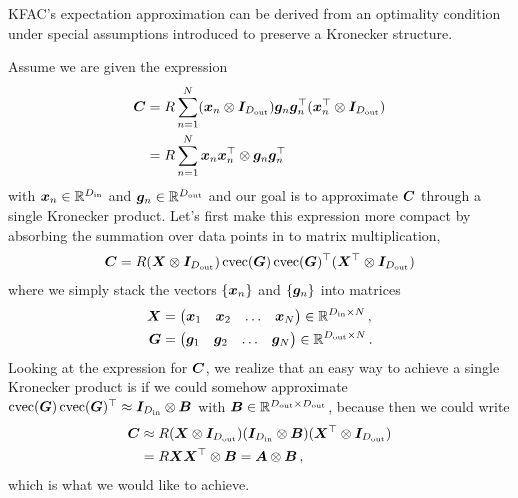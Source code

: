 \begin{example}
  KFAC's expectation approximation can be derived from an optimality condition under special assumptions introduced to preserve a Kronecker structure.

  Assume we are given the expression
  \begin{align*}
    {\bm{C}}
    &=
      R \sum_{n=1}^N
      ({\bm{x}}_n \otimes {\bm{I}}_{D_{\text{out}}})
      {\bm{g}}_n {\bm{g}}_n^{\top}
      ({\bm{x}}_n^{\top} \otimes {\bm{I}}_{D_{\text{out}}})
    \\
    &=
      R \sum_{n=1}^N
      {\bm{x}}_n {\bm{x}}_n^{\top} \otimes {\bm{g}}_n {\bm{g}}_n^{\top}
  \end{align*}
  with ${\bm{x}}_n \in {\mathbb{R}}^{D_{\text{in}}}$ and ${\bm{g}}_n \in {\mathbb{R}}^{D_{\text{out}}}$ and our goal is to approximate ${\bm{C}}$ through a single Kronecker product.
  Let's first make this expression more compact by absorbing the summation over data points in to matrix multiplication,
  \begin{align*}
    {\bm{C}} =
    R ({\bm{X}} \otimes {\bm{I}}_{D_{\text{out}}})
    \operatorname{cvec}({\bm{G}}) \operatorname{cvec}({\bm{G}})^{\top}
    ({\bm{X}}^{\top} \otimes {\bm{I}}_{D_{\text{out}}})
  \end{align*}
  where we simply stack the vectors $\{ {\bm{x}}_n \}$ and $\{{\bm{g}}_n \}$ into matrices
  \begin{align*}
    {\bm{X}}
    &=
      \begin{pmatrix}
        {\bm{x}}_1 & {\bm{x}}_2 & \ldots & {\bm{x}}_N
      \end{pmatrix}
      \in {\mathbb{R}}^{D_{\text{in}} \times N}\,,
    \\
    {\bm{G}}
    &=
      \begin{pmatrix}
        {\bm{g}}_1 & {\bm{g}}_2 & \ldots & {\bm{g}}_N
      \end{pmatrix}
      \in {\mathbb{R}}^{D_{\text{out}} \times N}\,.
  \end{align*}
  Looking at the expression for ${\bm{C}}$, we realize that an easy way to achieve a single Kronecker product is if we could somehow approximate $\operatorname{cvec}({\bm{G}}) \operatorname{cvec}({\bm{G}})^{\top} \approx {\bm{I}}_{D_{\text{in}}} \otimes {\bm{B}}$ with ${\bm{B}} \in {\mathbb{R}}^{D_{\text{out}}\times D_{\text{out}}}$, because then we could write
  \begin{align*}
    {\bm{C}}
    &\approx
      R ({\bm{X}} \otimes {\bm{I}}_{D_{\text{out}}})
      ({\bm{I}}_{D_{\text{in}}} \otimes {\bm{B}})
      ({\bm{X}}^{\top} \otimes {\bm{I}}_{D_{\text{out}}})
    \\
    &=
      R {\bm{X}} {\bm{X}}^{\top} \otimes {\bm{B}}
      =
      {\bm{A}} \otimes {\bm{B}}\,,
  \end{align*}
  which is what we would like to achieve.


\end{example}
